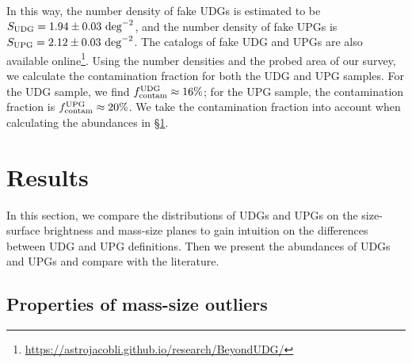 \documentclass[twocolumn,astrosymb,twocolappendix]{aastex631}
\begin{document}
\begin{CJK*}{UTF8}{gbsn}
In this way, the number density of fake UDGs is estimated to be $S_{\rm UDG} = 1.94\pm0.03\ \mathrm{deg}^{-2}$, and the number density of fake UPGs is $S_{\rm UPG} = 2.12\pm0.03\ \mathrm{deg}^{-2}$. The catalogs of fake UDG and UPGs are also available online\footnote{\url{https://astrojacobli.github.io/research/BeyondUDG/}}. Using the number densities and the probed area of our survey, we calculate the contamination fraction for both the UDG and UPG samples. For the UDG sample, we find $f_{\rm contam}^{\rm UDG} \approx 16\%$; for the UPG sample, the contamination fraction is $f_{\rm contam}^{\rm UPG} \approx 20\%$. We take the contamination fraction into account when calculating the abundances in \S\ref{sec:results}.



\section{Results}\label{sec:results}
In this section, we compare the distributions of UDGs and UPGs on the size-surface brightness and mass-size planes to gain intuition on the differences between UDG and UPG definitions. Then we present the abundances of UDGs and UPGs and compare with the literature. 

\subsection{Properties of mass-size outliers}\label{sec:mass-size}


\end{CJK*}
\end{document}
